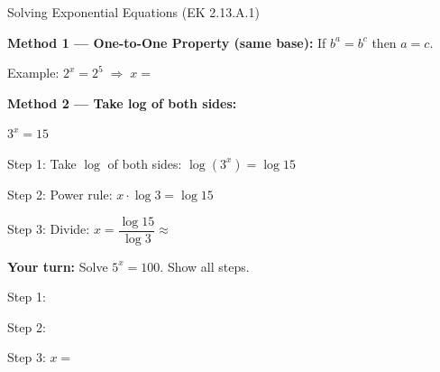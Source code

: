 \documentclass[10pt]{article}
\begin{document}
\begin{notesbox}{Solving Exponential Equations (EK 2.13.A.1)}

\textbf{Method 1 --- One-to-One Property (same base):}
If $b^a = b^c$ then $a = c$.

\vspace{4pt}
Example: \quad $2^x = 2^5 \;\Rightarrow\; x = $ 

\vspace{8pt}
\textbf{Method 2 --- Take log of both sides:}

\vspace{4pt}
$3^x = 15$

\vspace{4pt}
Step 1: Take $\log$ of both sides: \quad $\log(3^x) = \log 15$

\vspace{4pt}
Step 2: Power rule: \quad $x \cdot \log 3 = \log 15$

\vspace{4pt}
Step 3: Divide: \quad $x = \dfrac{\log 15}{\log 3} \approx $ 

\vspace{10pt}
\textbf{Your turn:} Solve $5^x = 100$. Show all steps.

\vspace{6pt}
Step 1: 

\vspace{4pt}
Step 2: 

\vspace{4pt}
Step 3: $x = $ 

\end{notesbox}

\vspace{0.06in}
\end{document}
